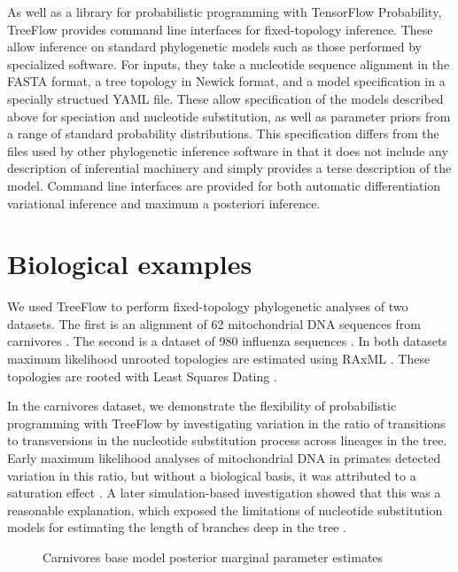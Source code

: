 As well as a library for probabilistic programming with TensorFlow Probability, TreeFlow provides command line interfaces for fixed-topology inference. These allow inference on standard phylogenetic models such as those performed by specialized software. For inputs, they take a nucleotide sequence alignment in the FASTA format, a tree topology in Newick format, and a model specification in a specially structued YAML file. These allow specification of the models described above for speciation and nucleotide substitution, as well as parameter priors from a range of standard probability distributions. This specification differs from the files used by other phylogenetic inference software \cite{drummond2007beast, hohna2016revbayes} in that it does not include any description of inferential machinery and simply provides a terse description of the model. Command line interfaces are provided for both automatic differentiation variational inference and maximum a posteriori inference.
\section{Biological examples}

We used TreeFlow to perform fixed-topology phylogenetic analyses of two datasets. The first is an alignment of 62 mitochondrial DNA sequences from carnivores \cite{suchard2009many}. The second is a dataset of 980 influenza sequences \cite{vaughan2014efficient}. In both datasets maximum likelihood unrooted topologies are estimated using RAxML \cite{stamatakis2014raxml}. These topologies are rooted with Least Squares Dating \cite{to2016lsd}.

In the carnivores dataset, we demonstrate the flexibility of probabilistic programming with TreeFlow by investigating variation in the ratio of transitions to transversions in the nucleotide substitution process across lineages in the tree. Early maximum likelihood analyses of mitochondrial DNA in primates detected variation in this ratio, but without a biological basis, it was attributed to a saturation effect \cite{yang1999estimation}. A later simulation-based investigation showed that this was a reasonable explanation, which exposed the limitations of nucleotide substitution models for estimating the length of branches deep in the tree \cite{duchene2015declining}.

\begin{figure}
    \centering
    \caption{Carnivores base model posterior marginal parameter estimates}
    \label{fig:carnivoresmarginals}
\end{figure}

